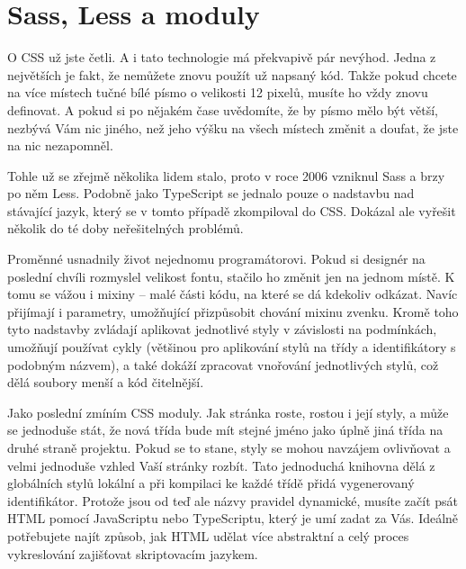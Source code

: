 \section{Sass, Less a moduly}

O CSS už jste četli. A i tato technologie má překvapivě pár nevýhod. Jedna z největších je fakt, že nemůžete znovu použít už napsaný kód. Takže pokud chcete na více místech tučné bílé písmo o velikosti 12 pixelů, musíte ho vždy znovu definovat. A pokud si po nějakém čase uvědomíte, že by písmo mělo být větší, nezbývá Vám nic jiného, než jeho výšku na všech místech změnit a doufat, že jste na nic nezapomněl.

Tohle už se zřejmě několika lidem stalo, proto v roce 2006 vzniknul Sass\cite{Sass} a brzy po něm Less\cite{Less}. Podobně jako TypeScript se jednalo pouze o nadstavbu nad stávající jazyk, který se v tomto případě zkompiloval do CSS. Dokázal ale vyřešit několik do té doby neřešitelných problémů.

Proměnné usnadnily život nejednomu programátorovi. Pokud si designér na poslední chvíli rozmyslel velikost fontu, stačilo ho změnit jen na jednom místě. K tomu se vážou i mixiny – malé části kódu, na které se dá kdekoliv odkázat. Navíc přijímají i parametry, umožňující přizpůsobit chování mixinu zvenku. Kromě toho tyto nadstavby zvládají aplikovat jednotlivé styly v závislosti na podmínkách, umožňují používat cykly (většinou pro aplikování stylů na třídy a identifikátory s podobným názvem), a také dokáží zpracovat vnořování jednotlivých stylů, což dělá soubory menší a kód čitelnější.

Jako poslední zmíním CSS moduly.\cite{CssModules} Jak stránka roste, rostou i její styly, a může se jednoduše stát, že nová třída bude mít stejné jméno jako úplně jiná třída na druhé straně projektu. Pokud se to stane, styly se mohou navzájem ovlivňovat a velmi jednoduše vzhled Vaší stránky rozbít. Tato jednoduchá knihovna dělá z globálních stylů lokální a při kompilaci ke každé třídě přidá vygenerovaný identifikátor. Protože jsou od teď ale názvy pravidel dynamické, musíte začít psát HTML pomocí JavaScriptu nebo TypeScriptu, který je umí zadat za Vás. Ideálně potřebujete najít způsob, jak HTML udělat více abstraktní a celý proces vykreslování zajišťovat skriptovacím jazykem.